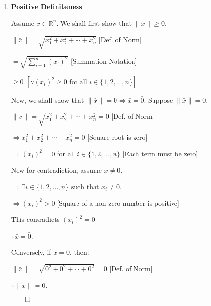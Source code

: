\begin{proofbox}
\begin{enumerate}[label=\arabic*., series=normprops]
    \item \textbf{Positive Definiteness}
    
    Assume $\bar{x} \in \mathbb{R}^n$. We shall first show that $\|\bar{x}\| \geq 0$.

    \quad $\|\bar{x}\| = \sqrt{x_1^2 + x_2^2 + \cdots + x_n^2}$ \hfill [Def. of Norm]

    \quad $= \sqrt{\sum_{i=1}^n (x_i)^2}$ \hfill [Summation Notation]

    \quad $\geq 0$ \hfill $[ \because (x_i)^2 \geq 0 \text{ for all } i \in \{1, 2, \ldots, n\}]$

    Now, we shall show that $\|\bar{x}\| = 0 \Leftrightarrow \bar{x} = \bar{0}$.
    Suppose $\|\bar{x}\| = 0$.

    \quad $\|\bar{x}\| = \sqrt{x_1^2 + x_2^2 + \cdots + x_n^2} = 0$ \hfill [Def. of Norm]

    \quad $\Rightarrow x_1^2 + x_2^2 + \cdots + x_n^2 = 0$ \hfill [Square root is zero]

    \quad $\Rightarrow (x_i)^2 = 0$ for all $i \in \{1, 2, \ldots, n\}$ \hfill [Each term must be zero]

    Now for contradiction, assume $\bar{x} \neq \bar{0}$.

    \quad $\Rightarrow \exists i \in \{1, 2, \ldots, n\} \text{ such that } x_i \neq 0$.

    \quad $\Rightarrow (x_i)^2 > 0$ \hfill [Square of a non-zero number is positive]

    \quad This contradicts $(x_i)^2 = 0$.

    \quad $\therefore \bar{x} = \bar{0}$.

    Conversely, if $\bar{x} = \bar{0}$, then:

    \quad $\|\bar{x}\| = \sqrt{0^2 + 0^2 + \cdots + 0^2} = 0$ \hfill [Def. of Norm]

    \quad $\therefore \|\bar{x}\| = 0$.

    \hfill $\qed$
\end{enumerate}

\end{proofbox}

\newpage

